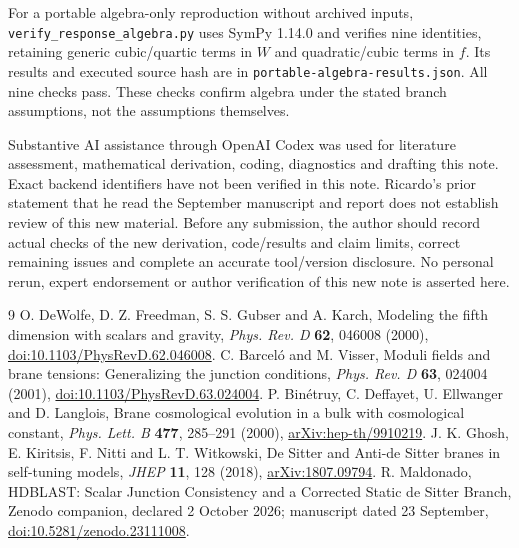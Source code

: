 \documentclass[11pt]{article}
\begin{document}
For a portable algebra-only reproduction without archived inputs, \texttt{verify\_response\_algebra.py} uses SymPy 1.14.0 and verifies nine identities, retaining generic cubic/quartic terms in $W$ and quadratic/cubic terms in $f$. Its results and executed source hash are in \texttt{portable-algebra-results.json}. All nine checks pass. These checks confirm algebra under the stated branch assumptions, not the assumptions themselves.

Substantive AI assistance through OpenAI Codex was used for literature assessment, mathematical derivation, coding, diagnostics and drafting this note. Exact backend identifiers have not been verified in this note. Ricardo's prior statement that he read the September manuscript and report does not establish review of this new material. Before any submission, the author should record actual checks of the new derivation, code/results and claim limits, correct remaining issues and complete an accurate tool/version disclosure. No personal rerun, expert endorsement or author verification of this new note is asserted here.

\begin{thebibliography}{9}
 O. DeWolfe, D. Z. Freedman, S. S. Gubser and A. Karch, Modeling the fifth dimension with scalars and gravity, \emph{Phys. Rev. D} \textbf{62}, 046008 (2000), \href{https://doi.org/10.1103/PhysRevD.62.046008}{doi:10.1103/PhysRevD.62.046008}.
 C. Barcel\'o and M. Visser, Moduli fields and brane tensions: Generalizing the junction conditions, \emph{Phys. Rev. D} \textbf{63}, 024004 (2001), \href{https://doi.org/10.1103/PhysRevD.63.024004}{doi:10.1103/PhysRevD.63.024004}.
 P. Bin\'etruy, C. Deffayet, U. Ellwanger and D. Langlois, Brane cosmological evolution in a bulk with cosmological constant, \emph{Phys. Lett. B} \textbf{477}, 285--291 (2000), \href{https://arxiv.org/abs/hep-th/9910219}{arXiv:hep-th/9910219}.
 J. K. Ghosh, E. Kiritsis, F. Nitti and L. T. Witkowski, De Sitter and Anti-de Sitter branes in self-tuning models, \emph{JHEP} \textbf{11}, 128 (2018), \href{https://arxiv.org/abs/1807.09794}{arXiv:1807.09794}.
 R. Maldonado, HDBLAST: Scalar Junction Consistency and a Corrected Static de Sitter Branch, Zenodo companion, declared 2 October 2026; manuscript dated 23 September, \href{https://doi.org/10.5281/zenodo.23111008}{doi:10.5281/zenodo.23111008}.
\end{thebibliography}
\end{document}
